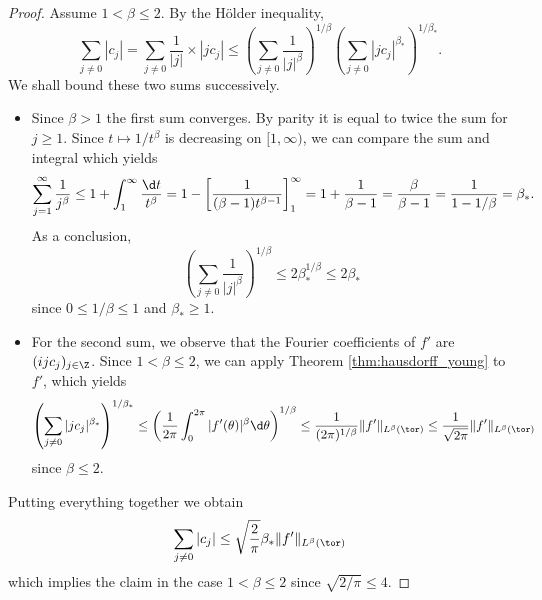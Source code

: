 \begin{proof}
  Assume $1 < \beta \leq 2$.
  By the H\"older inequality,
  \begin{equation*}
    \sum_{j \neq 0} |c_j|
    = \sum_{j \neq 0} \frac{1}{|j|} \times |j c_j|
    \leq
    \left(\sum_{j \neq 0} \frac{1}{|j|^\beta} \right)^{1/\beta}
    \left(\sum_{j \neq 0} |j c_j|^{\beta_*} \right)^{1/\beta_*}.
  \end{equation*}
  We shall bound these two sums successively.
  \begin{itemize}
    \item   Since $\beta>1$ the first sum converges. By parity it is equal to twice the sum for $j \geq 1$.
  Since $t \mapsto 1/t^\beta$
  is decreasing on $[1,\infty)$, we can compare the sum and integral which yields
  \begin{equation*}
    \sum_{j =1}^\infty \frac{1}{j^\beta}
    \leq 1 + \int_1^\infty \frac{\d t}{t^\beta}
    = 1 - \left[ \frac{1}{(\beta-1)t^{\beta-1}} \right]_1^\infty
    = 1 + \frac{1}{\beta - 1}
    = \frac{\beta}{\beta - 1} = \frac{1}{1 - 1/\beta} = \beta_*.
  \end{equation*}
  As a conclusion,
  \begin{equation*}
    \left(\sum_{j \neq 0} \frac{1}{|j|^\beta} \right)^{1/\beta}
    \leq 2 \beta_*^{1/\beta} \leq 2 \beta_*
  \end{equation*}
  since $0 \leq 1/\beta \leq 1$ and $\beta_* \geq 1$.
  \item For the second sum, we observe that the Fourier coefficients of $f'$
  are $(i j c_j)_{j \in \Z}$. Since $1 < \beta \leq 2$, we can
  apply Theorem \ref{thm:hausdorff_young} to $f'$, which yields
  \begin{equation*}
    \left(\sum_{j \neq 0} |j c_j|^{\beta_*} \right)^{1/\beta_*}
    \leq
    \left(\frac{1}{2 \pi} \int_0^{2 \pi} |f'(\theta)|^\beta \d \theta\right)^{1/\beta}
    \leq \frac{1}{(2 \pi)^{1/\beta}} \|f'\|_{L^\beta(\tor)}
    \leq \frac{1}{\sqrt{2 \pi}} \|f'\|_{L^\beta(\tor)}
  \end{equation*}
  since $\beta \leq 2$.
  \end{itemize}
  Putting everything together we obtain
  \begin{equation*}
    \sum_{j \neq 0} |c_j|
    \leq \sqrt{\frac{2}{\pi}} \beta_*  \|f'\|_{L^\beta(\tor)}
  \end{equation*}
  which implies the claim in the case $1 < \beta \leq 2$ since $\sqrt{2/\pi} \leq 4$.


\end{proof}
